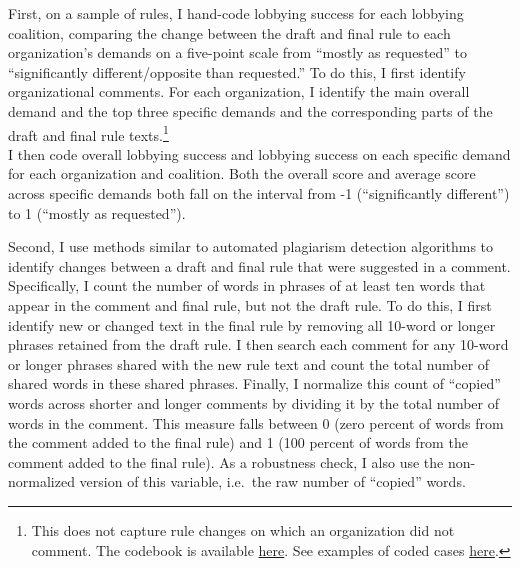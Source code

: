 \documentclass[
      12pt,
        ]{article}
\begin{document}
First, on a sample of rules, I hand-code lobbying success for each lobbying coalition, comparing the change between the draft and final rule to each organization's demands on a five-point scale from ``mostly as requested'' to ``significantly different/opposite than requested.''
To do this, I first identify organizational comments.
For each organization, I identify the main overall demand and the top three specific demands and the corresponding parts of the draft and final rule texts.\footnote{This does not capture rule changes on which an organization did not comment.
  The codebook is available \href{https://docs.google.com/document/d/1o1hi0z9O-G9xsgkspOFG2VWzh0wQKjiezzoVpItaCxU/edit?usp=sharing}{here}. See examples of coded cases \href{https://judgelord.github.io/dissertation/influence_coding_examples.pdf}{here}.}\\
I then code overall lobbying success and lobbying success on each specific demand for each organization and coalition. Both the overall score and average score across specific demands both fall on the interval from -1 (``significantly different'') to 1 (``mostly as requested'').

Second, I use methods similar to automated plagiarism detection algorithms to identify changes between a draft and final rule that were suggested in a comment. Specifically, I count the number of words in phrases of at least ten words that appear in the comment and final rule, but not the draft rule. To do this, I first identify new or changed text in the final rule by removing all 10-word or longer phrases retained from the draft rule. I then search each comment for any 10-word or longer phrases shared with the new rule text and count the total number of shared words in these shared phrases. Finally, I normalize this count of ``copied'' words across shorter and longer comments by dividing it by the total number of words in the comment. This measure falls between 0 (zero percent of words from the comment added to the final rule) and 1 (100 percent of words from the comment added to the final rule). As a robustness check, I also use the non-normalized version of this variable, i.e.~the raw number of ``copied'' words.
\end{document}
